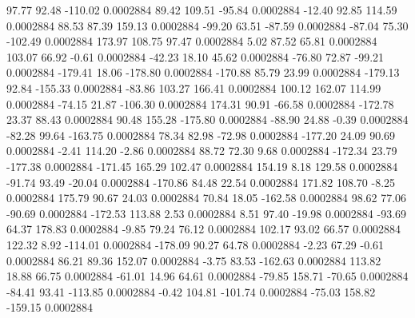        97.77       92.48     -110.02     0.0002884
       89.42      109.51      -95.84     0.0002884
      -12.40       92.85      114.59     0.0002884
       88.53       87.39      159.13     0.0002884
      -99.20       63.51      -87.59     0.0002884
      -87.04       75.30     -102.49     0.0002884
      173.97      108.75       97.47     0.0002884
        5.02       87.52       65.81     0.0002884
      103.07       66.92       -0.61     0.0002884
      -42.23       18.10       45.62     0.0002884
      -76.80       72.87      -99.21     0.0002884
     -179.41       18.06     -178.80     0.0002884
     -170.88       85.79       23.99     0.0002884
     -179.13       92.84     -155.33     0.0002884
      -83.86      103.27      166.41     0.0002884
      100.12      162.07      114.99     0.0002884
      -74.15       21.87     -106.30     0.0002884
      174.31       90.91      -66.58     0.0002884
     -172.78       23.37       88.43     0.0002884
       90.48      155.28     -175.80     0.0002884
      -88.90       24.88       -0.39     0.0002884
      -82.28       99.64     -163.75     0.0002884
       78.34       82.98      -72.98     0.0002884
     -177.20       24.09       90.69     0.0002884
       -2.41      114.20       -2.86     0.0002884
       88.72       72.30        9.68     0.0002884
     -172.34       23.79     -177.38     0.0002884
     -171.45      165.29      102.47     0.0002884
      154.19        8.18      129.58     0.0002884
      -91.74       93.49      -20.04     0.0002884
     -170.86       84.48       22.54     0.0002884
      171.82      108.70       -8.25     0.0002884
      175.79       90.67       24.03     0.0002884
       70.84       18.05     -162.58     0.0002884
       98.62       77.06      -90.69     0.0002884
     -172.53      113.88        2.53     0.0002884
        8.51       97.40      -19.98     0.0002884
      -93.69       64.37      178.83     0.0002884
       -9.85       79.24       76.12     0.0002884
      102.17       93.02       66.57     0.0002884
      122.32        8.92     -114.01     0.0002884
     -178.09       90.27       64.78     0.0002884
       -2.23       67.29       -0.61     0.0002884
       86.21       89.36      152.07     0.0002884
       -3.75       83.53     -162.63     0.0002884
      113.82       18.88       66.75     0.0002884
      -61.01       14.96       64.61     0.0002884
      -79.85      158.71      -70.65     0.0002884
      -84.41       93.41     -113.85     0.0002884
       -0.42      104.81     -101.74     0.0002884
      -75.03      158.82     -159.15     0.0002884
